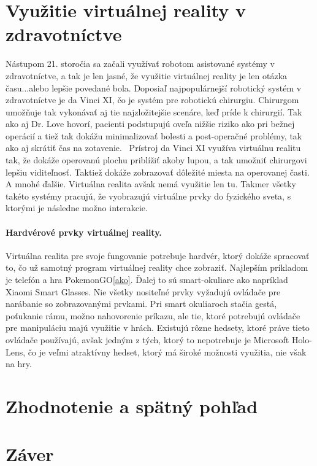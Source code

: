\documentclass[10pt,twoside,a4paper]{article}
\begin{document}
\section{Využitie virtuálnej reality v zdravotníctve} \label{zdravotnictvo}
Nástupom 21. storočia sa začali využívať robotom asistované systémy v zdravotníctve, a tak je len jasné, že využitie virtuálnej reality je len otázka času...alebo lepšie povedané bola. Doposiaľ najpopulárnejší robotický systém v zdravotníctve je da Vinci XI, čo je systém pre robotickú chirurgiu. Chirurgom umožňuje tak vykonávať aj tie najzložitejšie scenáre, keď príde k chirurgií. Tak ako aj Dr. Love hovorí, pacienti podstupujú oveľa nižšie riziko ako pri bežnej operácií a tiež tak dokážu minimalizovať bolesti a post-operačné problémy, tak ako aj skrátiť čas na zotavenie.~\cite{XiRobots}
Prístroj da Vinci XI využíva virtuálnu realitu tak, že dokáže operovanú plochu priblížiť akoby lupou, a tak umožniť chirurgovi lepšiu viditeľnosť. Taktiež dokáže zobrazovať dôležité miesta na operovanej časti. A mnohé ďalšie. Virtuálna realita avšak nemá využitie len tu. Takmer všetky takéto systémy pracujú, že vyobrazujú virtuálne prvky do fyzického sveta, s ktorými je následne možno interakcie. 

\paragraph{Hardvérové prvky virtuálnej reality.}
Virtuálna realita pre svoje fungovanie potrebuje hardvér, ktorý dokáže spracovať to, čo už samotný program virtuálnej reality chce zobraziť. Najlepším príkladom je telefón a hra PokemonGO\ref{ako}. Ďalej to sú smart-okuliare ako napríklad Xiaomi Smart Glasses. Nie všetky nositeľné prvky vyžadujú ovládače pre narábanie so zobrazovanými prvkami. Pri smart okuliaroch stačia gestá, poťukanie rámu, možno nahovorenie príkazu, ale tie, ktoré potrebujú ovládače pre manipuláciu majú využitie v hrách. Existujú rôzne hedsety, ktoré práve tieto ovládače používajú, avšak jedným z tých, ktorý to nepotrebuje je Microsoft Holo-Lens, čo je veľmi atraktívny hedset, ktorý má široké možnosti využitia, nie však na hry.

\section{Zhodnotenie a spätný pohľad} \label{konec}




\section{Záver} \label{zaver} %






\end{document}
